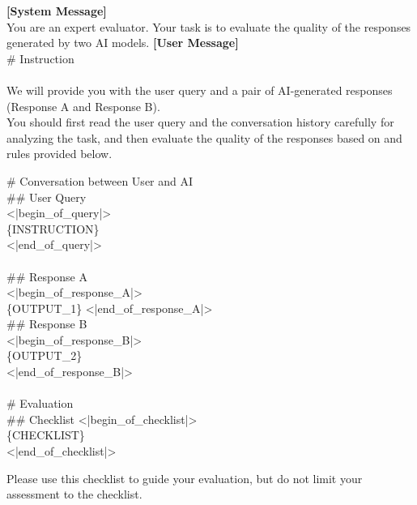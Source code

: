 \begin{figure*}[t!]
\begin{tcolorbox}[colback=black!3!white, colframe=black!70!white, title=WildBench, fontupper=\footnotesize, fonttitle=\footnotesize]
\textbf{[System Message]} \\
You are an expert evaluator. Your task is to evaluate the quality of the responses generated by two AI models. 
\newline
\textbf{[User Message]}\\
\# Instruction 
\\ \\ 
We will provide you with the user query and a pair of AI-generated responses (Response A and Response B). \\
You should first read the user query and the conversation history carefully for analyzing the task, and then evaluate the quality of the responses based on and rules provided below. \\
\newline

\# Conversation between User and AI
\\ 
\#\# User Query \\
<|begin\_of\_query|> \\
\{INSTRUCTION\} \\
<|end\_of\_query|>
\\ \\
\#\# Response A \\
<|begin\_of\_response\_A|> \\
\{OUTPUT\_1\}
\newline
<|end\_of\_response\_A|> \\

\#\# Response B \\
<|begin\_of\_response\_B|> \\
\{OUTPUT\_2\}
\\
<|end\_of\_response\_B|>
\\
\\
\# Evaluation   
\\ 
\#\# Checklist 
\newline
<|begin\_of\_checklist|> \\
\{CHECKLIST\} \\
<|end\_of\_checklist|> \\
\newline

Please use this checklist to guide your evaluation, but do not limit your assessment to the checklist.
\\
\\ 


\end{tcolorbox}
\end{figure*}
